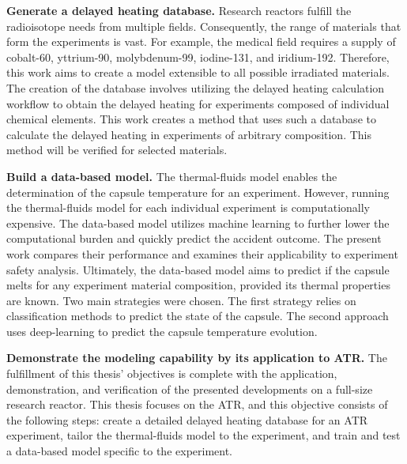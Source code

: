 
\textbf{Generate a delayed heating database.}
Research reactors fulfill the radioisotope needs from multiple fields.
Consequently, the range of materials that form the experiments is vast.
For example, the medical field requires a supply of cobalt-60, yttrium-90, molybdenum-99, iodine-131, and iridium-192.
Therefore, this work aims to create a model extensible to all possible irradiated materials.
The creation of the database involves utilizing the delayed heating calculation workflow to obtain the delayed heating for experiments composed of individual chemical elements.
This work creates a method that uses such a database to calculate the delayed heating in experiments of arbitrary composition.
This method will be verified for selected materials.

\textbf{Build a data-based model.}
The thermal-fluids model enables the determination of the capsule temperature for an experiment.
However, running the thermal-fluids model for each individual experiment is computationally expensive.
The data-based model utilizes machine learning to further lower the computational burden and quickly predict the accident outcome.
The present work compares their performance and examines their applicability to experiment safety analysis.
Ultimately, the data-based model aims to predict if the capsule melts for any experiment material composition, provided its thermal properties are known.
Two main strategies were chosen.
The first strategy relies on classification methods to predict the state of the capsule.
The second approach uses deep-learning to predict the capsule temperature evolution.

\textbf{Demonstrate the modeling capability by its application to ATR.}
The fulfillment of this thesis' objectives is complete with the application, demonstration, and verification of the presented developments on a full-size research reactor.
This thesis focuses on the \gls*{ATR}, and this objective consists of the following steps: create a detailed delayed heating database for an ATR experiment, tailor the thermal-fluids model to the experiment, and train and test a data-based model specific to the experiment.


